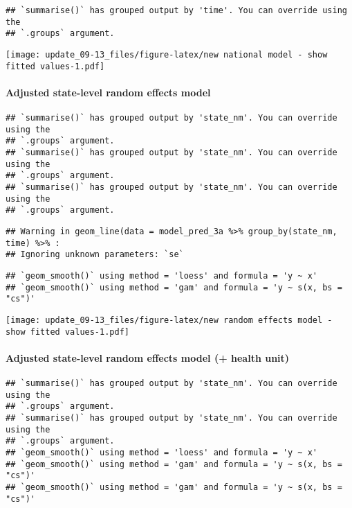 \documentclass[
]{article}
\begin{document}
\begin{verbatim}
## `summarise()` has grouped output by 'time'. You can override using the
## `.groups` argument.
\end{verbatim}

\texttt{[image: update\_09-13\_files/figure-latex/new national model - show fitted values-1.pdf]}
\newpage

\newpage

\hypertarget{adjusted-state-level-random-effects-model}{%
\paragraph{Adjusted state-level random effects
model}\label{adjusted-state-level-random-effects-model}}

\begin{verbatim}
## `summarise()` has grouped output by 'state_nm'. You can override using the
## `.groups` argument.
## `summarise()` has grouped output by 'state_nm'. You can override using the
## `.groups` argument.
## `summarise()` has grouped output by 'state_nm'. You can override using the
## `.groups` argument.
\end{verbatim}

\begin{verbatim}
## Warning in geom_line(data = model_pred_3a %>% group_by(state_nm, time) %>% :
## Ignoring unknown parameters: `se`
\end{verbatim}

\begin{verbatim}
## `geom_smooth()` using method = 'loess' and formula = 'y ~ x'
## `geom_smooth()` using method = 'gam' and formula = 'y ~ s(x, bs = "cs")'
\end{verbatim}

\texttt{[image: update\_09-13\_files/figure-latex/new random effects model - show fitted values-1.pdf]}
\newpage

\hypertarget{adjusted-state-level-random-effects-model-health-unit}{%
\paragraph{Adjusted state-level random effects model (+ health
unit)}\label{adjusted-state-level-random-effects-model-health-unit}}

\begin{verbatim}
## `summarise()` has grouped output by 'state_nm'. You can override using the
## `.groups` argument.
## `summarise()` has grouped output by 'state_nm'. You can override using the
## `.groups` argument.
## `geom_smooth()` using method = 'loess' and formula = 'y ~ x'
## `geom_smooth()` using method = 'gam' and formula = 'y ~ s(x, bs = "cs")'
## `geom_smooth()` using method = 'gam' and formula = 'y ~ s(x, bs = "cs")'
\end{verbatim}
\end{document}
